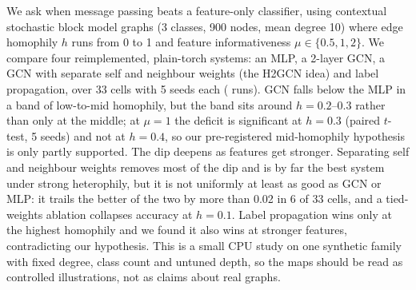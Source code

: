 We ask when message passing beats a feature-only classifier, using contextual stochastic block model graphs (3 classes, 900 nodes, mean degree 10) where edge homophily $h$ runs from 0 to 1 and feature informativeness $\mu\in\{0.5,1,2\}$.
We compare four reimplemented, plain-torch systems: an MLP, a 2-layer GCN, a GCN with separate self and neighbour weights (the H2GCN idea) and label propagation, over 33 cells with 5 seeds each ( runs).
GCN falls below the MLP in a band of low-to-mid homophily, but the band sits around $h=0.2$--$0.3$ rather than only at the middle; at $\mu=1$ the deficit is significant at $h=0.3$ (paired $t$-test, 5 seeds) and not at $h=0.4$, so our pre-registered mid-homophily hypothesis is only partly supported.
The dip deepens as features get stronger.
Separating self and neighbour weights removes most of the dip and is by far the best system under strong heterophily, but it is not uniformly at least as good as GCN or MLP: it trails the better of the two by more than 0.02 in 6 of 33 cells, and a tied-weights ablation collapses accuracy at $h=0.1$.
Label propagation wins only at the highest homophily and we found it also wins at stronger features, contradicting our hypothesis.
This is a small CPU study on one synthetic family with fixed degree, class count and untuned depth, so the maps should be read as controlled illustrations, not as claims about real graphs.
